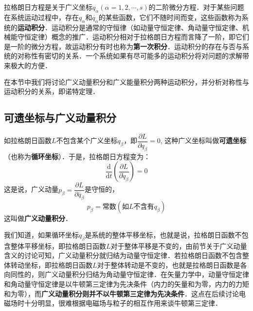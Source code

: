 

拉格朗日方程是关于广义坐标$q_\alpha(\alpha=1,2,\cdots,s)$的二阶微分方程．对于某些问题在系统运动过程中，存在$q_\alpha$和$\dot{q_\alpha}$的某些函数，它们不随时间而变，这些函数称为系统的\textbf{运动积分}．运动积分是通常的守恒律（如动量守恒定律、角动量守恒定律、机械能守恒定律）概念的推广．运动积分相对于拉格朗日方程而言降了一阶，即它们是一阶的微分方程，故运动积分有时也称为\textbf{第一次积分}．运动积分的存在与否与系统的对称性有密切的关系．一个系统如果有尽可能多的运动积分将对问题的求解带来极大的方便．

在本节中我们将讨论广义动量积分和广义能量积分两种运动积分，并分析对称性与运动积分的关系，即诺特定理．

\subsection{可遗坐标与广义动量积分}

如拉格朗日函数$L$不包含某个广义坐标$q_\beta$，即$\dfrac{\partial L}{\partial q_\beta}=0$, 这种广义坐标叫做\textbf{可遗坐标}（也称为\textbf{循环坐标}）．于是，拉格朗日方程变为：
\begin{equation}
\frac{\mathrm{d}}{\mathrm{d} t}\left(\frac{\partial L}{\partial \dot{q}_{\beta}}\right)=0
\end{equation}
这是说，广义动量$p_\beta=\dfrac{\partial L} {\partial \dot{q_\beta}}$是守恒的，
\begin{equation}
p_\beta=常数(如L不含有q_\beta)
\end{equation}
这叫做\textbf{广义动量积分}．

我们知道，如果循环坐标$q_\beta$是系统的整体平移坐标，也就是说，拉格朗日函数不包含整体平移坐标，即拉格朗日函数$L $对于整体平移是不变的，由前节关于广义动量含义的讨论可知，广义动量积分就归结为动量守恒定律．若拉格朗日函数不包含整体转动坐标，即拉格朗日函数$L$对于整体转动是不变的，也就是拉格朗日函数是各向同性的，则广义动量积分归结为角动量守恒定律．在矢量力学中，动量守恒定律和角动量守恒定律是以牛顿第三定律为先决条件（内力的矢量和为零，内力的力矩和为零），而\textbf{广义动量积分则并不以牛顿第三定律为先决条件}．这点在后续讨论电磁场时十分明显，很难根据电磁场与粒子的相互作用来谈牛顿第三定律．

